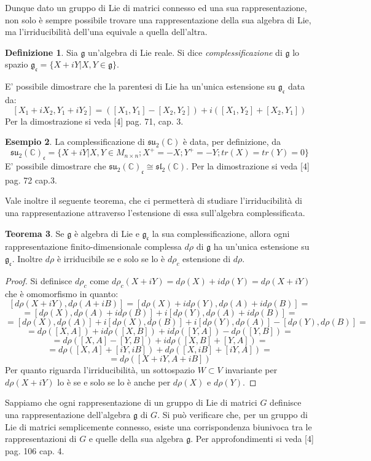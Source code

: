 \documentclass[12pt,a4paper]{report}
\theoremstyle{definition}
\newtheorem{Def}{Definizione}[chapter]
\theoremstyle{Theorem}
\newtheorem{Theo}[Def]{Teorema}
\theoremstyle{definition}
\newtheorem{Ex}[Def]{Esempio}
\theoremstyle{definition}
\theoremstyle{definition}
\begin{document}
Dunque dato un gruppo di Lie di matrici connesso ed una sua rappresentazione, non solo è sempre possibile trovare una rappresentazione della sua algebra di Lie, ma l'irriducibilità dell'una equivale a quella dell'altra.
\begin{Def}
	Sia $\mathfrak{g}$ un'algebra di Lie reale. Si dice \textit{complessificazione} di $\mathfrak{g}$ lo spazio $\mathfrak{g_c}=\{X+iY|X,Y\in\mathfrak{g}\}$.
\end{Def}
E' possibile dimostrare che la parentesi di Lie ha un'unica estensione su $\mathfrak{g_c}$ data da:
$$[X_1+iX_2,Y_1+iY_2]=([X_1,Y_1]-[X_2,Y_2])+i([X_1,Y_2]+[X_2,Y_1])$$
Per la dimostrazione si veda [4] pag. 71, cap. 3.\\
\begin{Ex}
La complessificazione di $\mathfrak{su_2(\mathbb{C})}$ è data, per definizione, da $$\mathfrak{su_2(\mathbb{C})_c}=\{X+iY|X,Y\in M_{n\times n} ;X^{+}=-X;Y^{+}=-Y;tr(X)=tr(Y)=0\}$$
E' possibile dimostrare che $\mathfrak{su_2(\mathbb{C})_c}\cong \mathfrak{sl_2(\mathbb{C})}$. Per la dimostrazione si veda [4] pag. 72 cap.3.
\end{Ex}
Vale inoltre il seguente teorema, che ci permetterà di studiare l'irriducibilità di una rappresentazione attraverso l'estensione di essa sull'algebra complessificata.
\begin{Theo}
	Se $\mathfrak{g}$ è algebra di Lie e $\mathfrak{g_c}$ la sua complessificazione, allora ogni rappresentazione finito-dimensionale complessa  $d\rho$ di $\mathfrak{g}$ ha un'unica estensione su $\mathfrak{g_c}$. Inoltre $d\rho$ è irriducibile se e solo se lo è $d\rho_c$ estensione di $d\rho$.
\end{Theo}
\begin{proof}
	Si definisce $d\rho_c$ come $d\rho_c(X+iY)=d\rho(X)+id\rho(Y)=d\rho(X+iY)$ che è omomorfismo in quanto: 
	$$[d\rho(X+iY),d\rho(A+iB)]=[d\rho(X)+id\rho(Y),d\rho(A)+id\rho(B)]=$$$$=[d\rho(X),d\rho(A)+id\rho(B)]+i[d\rho(Y),d\rho(A)+id\rho(B)]=$$
	$$=[d\rho(X),d\rho(A)]+i[d\rho(X),d\rho(B)]+i[d\rho(Y),d\rho(A)]-[d\rho(Y),d\rho(B)]=$$
	$$=d\rho([X,A])+id\rho([X,B])+id\rho([Y,A])-d\rho([Y,B])=$$
	$$=d\rho([X,A]-[Y,B])+id\rho([X,B]+[Y,A])=$$
	$$=d\rho([X,A]+[iY,iB])+d\rho([X,iB]+[iY,A])=$$
	$$=d\rho([X+iY,A+iB])$$
	Per quanto riguarda l'irriducibilità, un sottospazio $W\subset V$ invariante per $d\rho(X+iY)$ lo è se e solo se lo è anche per $d\rho(X)$ e $d\rho(Y)$.
\end{proof}
Sappiamo che ogni rappresentazione di un gruppo di Lie di matrici $G$ definisce una rappresentazione dell'algebra $\mathfrak{g}$ di $G$.
Si può verificare che, per un gruppo di Lie di matrici semplicemente connesso, esiste una corrispondenza biunivoca tra le rappresentazioni di $G$ e quelle della sua algebra $\mathfrak{g}$. Per approfondimenti si veda [4] pag. 106 cap. 4.
\end{document}
